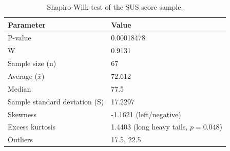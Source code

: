 
\begin{table}[tbp]
\centering
\begin{tabular}{@{}ll@{}}
\toprule
Parameter & Value \\ \midrule
P-value & 0.00018478 \\
W & 0.9131 \\
Sample size (n) & 67 \\
Average ($\bar{x}$) & 72.612 \\
Median & 77.5 \\
Sample standard deviation (S) & 17.2297 \\
Skewness & -1.1621 (left/negative) \\
Excess kurtosis & 1.4403 (long heavy tails, $p=0.048$) \\
Outliers & 17.5, 22.5 \\
\bottomrule
\end{tabular}
\caption{Shapiro-Wilk test of the SUS score sample.}
\label{tab:sus-shapiro-wilk}
\end{table}
